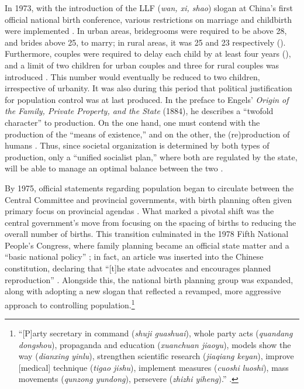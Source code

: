 \documentclass[12pt, a4paper, twoside]{article}
\begin{document}
In 1973, with the introduction of the LLF (\emph{wan, xi, shao}) slogan at China’s first official national birth conference, various restrictions on marriage and childbirth were implemented \autocite[p.\ 88]{GreenhalghWinckler2005}. In urban areas, bridegrooms were required to be above 28, and brides above 25, to marry; in rural areas, it was 25 and 23 respectively (\cites[p.\ 586]{BongaartsGreenhalgh1985}[p.\ 149]{WhyteWangCai2015}). Furthermore, couples were required to delay each child by at least four years (\cites[p.\ 149]{BongaartsGreenhalgh1985}[p.\ 149]{WhyteWangCai2015}), and a limit of two children for urban couples and three for rural couples was introduced \autocite[p.\ 586]{BongaartsGreenhalgh1985}. This number would eventually be reduced to two children, irrespective of urbanity. It was also during this period that political justification for population control was at last produced. In the preface to Engels’ \emph{Origin of the Family, Private Property, and the State} (1884), he describes a “twofold character” to production. On the one hand, one must contend with the production of the “means of existence,” and on the other, the (re)production of humans \autocite[pp.\ 71--72]{Engels1972}. Thus, since societal organization is determined by both types of production, only a “unified socialist plan,” where both are regulated by the state, will be able to manage an optimal balance between the two \autocite[p.\ 71]{Greenhalgh2008JustOneChild}.

By 1975, official statements regarding population began to circulate between the Central Committee and provincial governments, with birth planning often given primary focus on provincial agendas \autocite[p.\ 89]{GreenhalghWinckler2005}. What marked a pivotal shift was the central government’s move from focusing on the spacing of births to reducing the overall number of births. This transition culminated in the 1978 Fifth National People’s Congress, where family planning became an official state matter and a “basic national policy” \autocite{LinZhibo2007};  in fact, an article was inserted into the Chinese constitution, declaring that “[t]he state advocates and encourages planned reproduction” \autocite[p.\ 65]{Tien1980WanXiShao}. Alongside this, the national birth planning group was expanded, along with adopting a new slogan that reflected a revamped, more aggressive approach to controlling population.\footnote{“[P]arty secretary in command (\emph{shuji guashuai}), whole party acts (\emph{quandang dongshou}), propaganda and education (\emph{xuanchuan jiaoyu}), models show the way (\emph{dianxing yinlu}), strengthen scientific research (\emph{jiaqiang keyan}), improve [medical] technique (\emph{tigao jishu}), implement measures (\emph{cuoshi luoshi}), mass movements (\emph{qunzong yundong}), persevere (\emph{zhizhi yiheng}).” \cite{GreenhalghWinckler2005}.}
\end{document}
